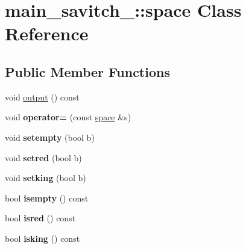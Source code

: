 \hypertarget{classmain__savitch__14_1_1space}{}\section{main\+\_\+savitch\+\_\+:\+:space Class Reference}
\label{classmain__savitch__14_1_1space}
\subsection*{Public Member Functions}
\begin{DoxyCompactItemize}
\item 
void \hyperlink{classmain__savitch__14_1_1space_ae84e9dcd39558b5555ead492bd0e3090}{output} () const
\item 
\mbox{\label{classmain__savitch__14_1_1space_a69bbbde78eb80714e40fe9797155ff97}} 
void {\bfseries operator=} (const \hyperlink{classmain__savitch__14_1_1space}{space} \&s)
\item 
\mbox{\label{classmain__savitch__14_1_1space_a81042116b78c65aa54681a3046cf729e}} 
void {\bfseries setempty} (bool b)
\item 
\mbox{\label{classmain__savitch__14_1_1space_aec4e5034b7016efd659f2ca73646ce68}} 
void {\bfseries setred} (bool b)
\item 
\mbox{\label{classmain__savitch__14_1_1space_a1d05ca01c48db5a08c3e4696714f2a60}} 
void {\bfseries setking} (bool b)
\item 
\mbox{\label{classmain__savitch__14_1_1space_ae29a747b426a5da674f25a17f3c311b3}} 
bool {\bfseries isempty} () const
\item 
\mbox{\label{classmain__savitch__14_1_1space_a40b1e916c254b78bd374599727c5753e}} 
bool {\bfseries isred} () const
\item 
\mbox{\label{classmain__savitch__14_1_1space_af4d5052a2c369cfac07587933958e3c5}} 
bool {\bfseries isking} () const
\end{DoxyCompactItemize}


